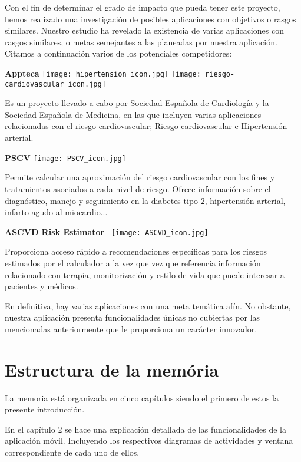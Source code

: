 \documentclass[11pt,spanish,
		listoftables,listoffigures]
		{tfgplantilla}
\begin{document}
Con el fin de determinar el grado de impacto que pueda tener este proyecto, hemos realizado una investigación de posibles aplicaciones con objetivos o rasgos similares. Nuestro estudio ha revelado la existencia de varias aplicaciones con rasgos similares, o metas semejantes a las planeadas por nuestra aplicación. Citamos a continuación varios de los potenciales competidores:

\noindent
\textbf {Appteca }
\texttt{[image: hipertension\_icon.jpg]}
\texttt{[image: riesgo-cardiovascular\_icon.jpg]}  

\noindent
Es un  proyecto llevado a cabo por Sociedad Española de Cardiología y la Sociedad Española de Medicina, en las que incluyen varias aplicaciones relacionadas con el riesgo cardiovascular; Riesgo cardiovascular e Hipertensión arterial.

\noindent
\textbf {PSCV}
\texttt{[image: PSCV\_icon.jpg]}

\noindent
Permite calcular una aproximación del riesgo cardiovascular con los fines y tratamientos asociados a cada nivel de riesgo. Ofrece información sobre el diagnóstico, manejo y seguimiento en la diabetes tipo 2, hipertensión arterial, infarto agudo al miocardio...

\noindent
\textbf {ASCVD Risk Estimator}
\ \texttt{[image: ASCVD\_icon.jpg]}

\noindent
Proporciona acceso rápido a recomendaciones específicas para los riesgos estimados por el calculador a la vez que vez que referencia información relacionado con terapia, monitorización y estilo de vida que puede interesar a pacientes y médicos.

\bigskip

En definitiva, hay varias aplicaciones con una meta temática afín. No obstante, nuestra aplicación presenta funcionalidades únicas no cubiertas por las mencionadas anteriormente que le proporciona un carácter innovador. 

\vfill
\section{Estructura de la mem\'oria}

La memoria está organizada en cinco capítulos siendo el primero de estos la presente introducción.

En el capítulo 2 se hace una explicación detallada de las funcionalidades de la aplicación móvil. Incluyendo los respectivos diagramas de actividades y ventana correspondiente de cada uno de ellos.
\end{document}
